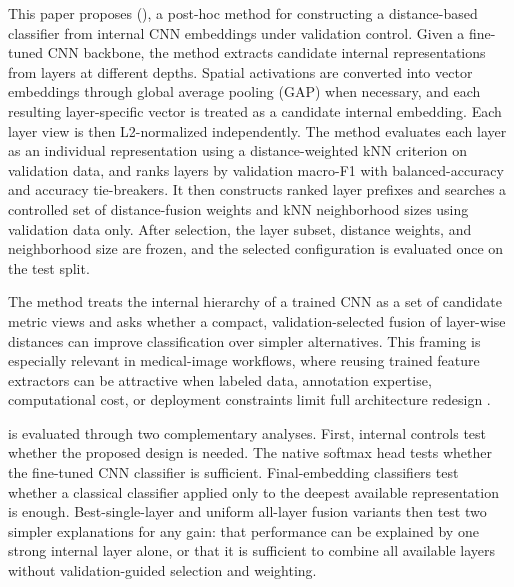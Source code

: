 \documentclass[main.tex]{subfiles}
\begin{document}
This paper proposes \fullmethod{} (\method{}), a post-hoc method for constructing a distance-based classifier from internal CNN embeddings under validation control. Given a fine-tuned CNN backbone, the method extracts candidate internal representations from layers at different depths. Spatial activations are converted into vector embeddings through global average pooling (GAP) when necessary, and each resulting layer-specific vector is treated as a candidate internal embedding. Each layer view is then L2-normalized independently. The method evaluates each layer as an individual representation using a distance-weighted kNN criterion on validation data, and ranks layers by validation macro-F1 with balanced-accuracy and accuracy tie-breakers. It then constructs ranked layer prefixes and searches a controlled set of distance-fusion weights and kNN neighborhood sizes using validation data only. After selection, the layer subset, distance weights, and neighborhood size are frozen, and the selected configuration is evaluated once on the test split.

The method treats the internal hierarchy of a trained CNN as a set of candidate metric views and asks whether a compact, validation-selected fusion of layer-wise distances can improve classification over simpler alternatives. This framing is especially relevant in medical-image workflows, where reusing trained feature extractors can be attractive when labeled data, annotation expertise, computational cost, or deployment constraints limit full architecture redesign \cite{yosinski2014transferable,bar2024frofa,dorfner2025review}.

\method{} is evaluated through two complementary analyses. First, internal controls test whether the proposed design is needed. The native softmax head tests whether the fine-tuned CNN classifier is sufficient. Final-embedding classifiers test whether a classical classifier applied only to the deepest available representation is enough. Best-single-layer and uniform all-layer fusion variants then test two simpler explanations for any gain: that performance can be explained by one strong internal layer alone, or that it is sufficient to combine all available layers without validation-guided selection and weighting.
\end{document}
